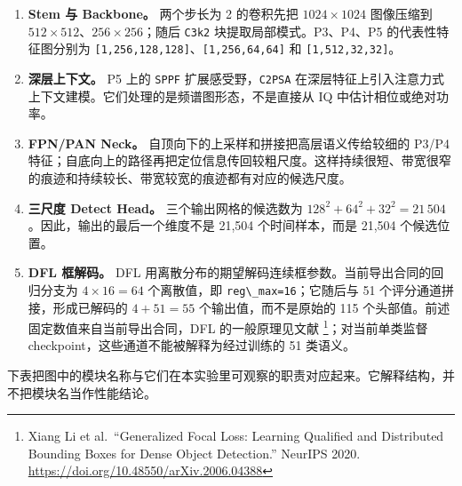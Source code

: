 \begin{enumerate}
\def\labelenumi{\arabic{enumi}.}
\tightlist
\item
  \textbf{Stem 与 Backbone。} 两个步长为 2 的卷积先把 \(1024\times1024\)
  图像压缩到 \(512\times512\)、\(256\times256\)；随后
  \passthrough{\lstinline!C3k2!} 块提取局部模式。P3、P4、P5
  的代表性特征图分别为
  \passthrough{\lstinline![1,256,128,128]!}、\passthrough{\lstinline![1,256,64,64]!}
  和 \passthrough{\lstinline![1,512,32,32]!}。
\item
  \textbf{深层上下文。} P5 上的 \passthrough{\lstinline!SPPF!}
  扩展感受野，\passthrough{\lstinline!C2PSA!}
  在深层特征上引入注意力式上下文建模。它们处理的是频谱图形态，不是直接从
  IQ 中估计相位或绝对功率。
\item
  \textbf{FPN/PAN Neck。} 自顶向下的上采样和拼接把高层语义传给较细的
  P3/P4
  特征；自底向上的路径再把定位信息传回较粗尺度。这样持续很短、带宽很窄的痕迹和持续较长、带宽较宽的痕迹都有对应的候选尺度。
\item
  \textbf{三尺度 Detect Head。} 三个输出网格的候选数为
  \(128^2+64^2+32^2=21\,504\)。因此，输出的最后一个维度不是 21,504
  个时间样本，而是 21,504 个候选位置。
\item
  \textbf{DFL 框解码。} DFL
  用离散分布的期望解码连续框参数。当前导出合同的回归分支为
  \(4\times16=64\) 个离散值，即
  \passthrough{\lstinline!reg\_max=16!}；它随后与 51
  个评分通道拼接，形成已解码的 \(4+51=55\) 个输出值，而不是原始的 115
  个头部值。前述固定数值来自当前导出合同，DFL 的一般原理见文献
  \footnote{Xiang Li et al.~``Generalized Focal Loss: Learning Qualified
    and Distributed Bounding Boxes for Dense Object Detection.'' NeurIPS
    2020. \url{https://doi.org/10.48550/arXiv.2006.04388}}；对当前单类监督
  checkpoint，这些通道不能被解释为经过训练的 51 类语义。
\end{enumerate}

下表把图中的模块名称与它们在本实验里可观察的职责对应起来。它解释结构，并不把模块名当作性能结论。

